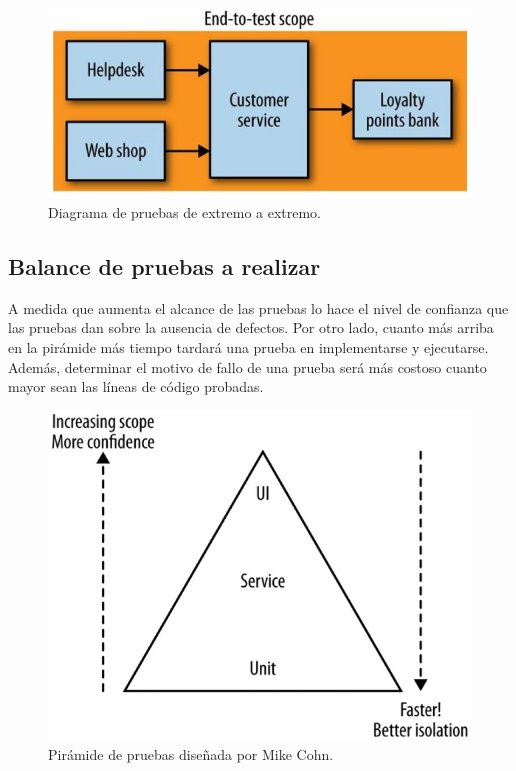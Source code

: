\documentclass[11pt,spanish,listoffigures,listoftables]{tfgetsinf}
\begin{document}
\begin{figure}[h]
\centering
\includegraphics[scale=0.5]{End_To_End_Test}
\caption{Diagrama de pruebas de extremo a extremo.}
\end{figure}

\subsection{Balance de pruebas a realizar}

A medida que aumenta el alcance de las pruebas lo hace el nivel de confianza que las pruebas dan sobre la ausencia de defectos. Por otro lado, cuanto más arriba en la pirámide más tiempo tardará una prueba en implementarse y ejecutarse. Además, determinar el motivo de fallo de una prueba será más costoso cuanto mayor sean las líneas de código probadas. \cite{Cohn2010}

\begin{figure}[h]
\centering
\includegraphics[scale=0.5]{Cohn_Pyramid}
\caption{Pirámide de pruebas diseñada por Mike Cohn. \cite{Cohn2010}}
\end{figure}
\end{document}
